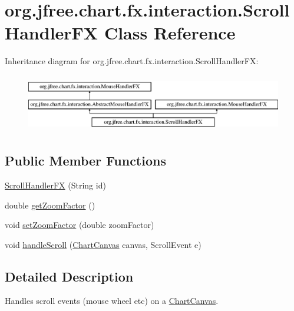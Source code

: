 \hypertarget{classorg_1_1jfree_1_1chart_1_1fx_1_1interaction_1_1_scroll_handler_f_x}{}\section{org.\+jfree.\+chart.\+fx.\+interaction.\+Scroll\+Handler\+FX Class Reference}
\label{classorg_1_1jfree_1_1chart_1_1fx_1_1interaction_1_1_scroll_handler_f_x}
Inheritance diagram for org.\+jfree.\+chart.\+fx.\+interaction.\+Scroll\+Handler\+FX\+:\begin{figure}[H]
\begin{center}
\leavevmode
\includegraphics[height=2.545455cm]{classorg_1_1jfree_1_1chart_1_1fx_1_1interaction_1_1_scroll_handler_f_x}
\end{center}
\end{figure}
\subsection*{Public Member Functions}
\begin{DoxyCompactItemize}
\item 
\mbox{\hyperlink{classorg_1_1jfree_1_1chart_1_1fx_1_1interaction_1_1_scroll_handler_f_x_a22460ed7b0a734cd37c02af6076d9f85}{Scroll\+Handler\+FX}} (String id)
\item 
double \mbox{\hyperlink{classorg_1_1jfree_1_1chart_1_1fx_1_1interaction_1_1_scroll_handler_f_x_aa29ef3a0adc537f6f08135fdc9bc5274}{get\+Zoom\+Factor}} ()
\item 
void \mbox{\hyperlink{classorg_1_1jfree_1_1chart_1_1fx_1_1interaction_1_1_scroll_handler_f_x_a2a6635d72ddc78f3038ebf3570049edd}{set\+Zoom\+Factor}} (double zoom\+Factor)
\item 
void \mbox{\hyperlink{classorg_1_1jfree_1_1chart_1_1fx_1_1interaction_1_1_scroll_handler_f_x_a59413aa0326296008a59e8c477a203ff}{handle\+Scroll}} (\mbox{\hyperlink{classorg_1_1jfree_1_1chart_1_1fx_1_1_chart_canvas}{Chart\+Canvas}} canvas, Scroll\+Event e)
\end{DoxyCompactItemize}


\subsection{Detailed Description}
Handles scroll events (mouse wheel etc) on a \mbox{\hyperlink{classorg_1_1jfree_1_1chart_1_1fx_1_1_chart_canvas}{Chart\+Canvas}}.

